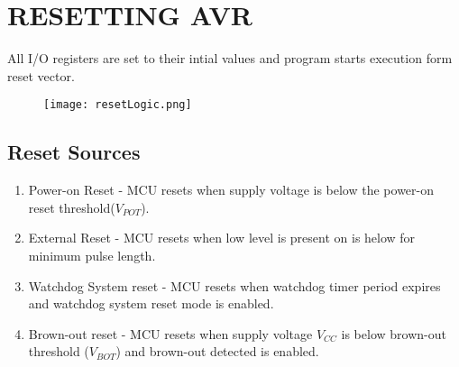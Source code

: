 \documentclass{article}
\begin{document}
\section{RESETTING AVR}
\quad All I/O registers are set to their intial values and program starts execution form reset vector.

\begin{figure}[H]
    \begin{center}
        \texttt{[image: resetLogic.png]}
    \end{center}
\end{figure}

\subsection{Reset Sources}
\begin{enumerate}[label=(\Roman*)]
    \item Power-on Reset - MCU resets when supply voltage is below the power-on reset threshold($V_{POT}$).
    \item External Reset - MCU resets when low level is present on  is helow for minimum pulse length.
    \item Watchdog System reset - MCU resets when watchdog timer period expires and watchdog system reset mode is enabled.
    \item Brown-out reset - MCU resets when supply voltage $V_{CC}$ is below brown-out threshold ($V_{BOT}$) and brown-out detected is enabled.
\end{enumerate}
\end{document}
